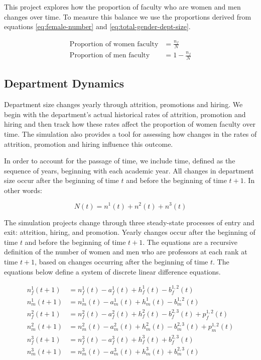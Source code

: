 \documentclass[12pt, a4paper, oneside, headinclude, footinclude,english]{article}
\begin{document}
This project explores how the proportion of  faculty who are women and men changes over time.  To measure this balance we use the proportions derived from equations \ref{eq:female-number} and \ref{eq:total-gender-dept-size}. 

\begin{align}
  \label{eq:pct-female}
  \text{Proportion of women faculty} &= \frac{n_f}{N} \label{eq:pct-female} \\
  \text{Proportion of men faculty} &= 1 - \frac{n_f}{N}          
\end{align}

\subsection{Department Dynamics}
\label{sec:dept-dynamics}

Department size changes yearly through attrition, promotions and hiring. We begin with the department's actual historical rates of attrition, promotion and hiring and then track how these rates affect the proportion of women faculty over time. The simulation also provides a tool for assessing how changes in the rates of attrition, promotion and hiring influence this outcome.

In order to account for the passage of time, we include time, defined as the sequence of years, beginning with each academic year.  All changes in department size occur after the beginning of time $t$ and before the beginning of time $t+1$. In other words:

\begin{equation*}
  N(t) = n^1(t) + n^2(t) + n^3(t) \label{eq:test}
\end{equation*}

The simulation projects change through three steady-state processes of entry and exit:
attrition, hiring, and promotion. Yearly changes occur after the beginning of time $t$ and before the beginning of time $t+1$.  The equations are a recursive definition of
the number of women and men who are professors at each rank at time $t+1$, based on
changes occurring after the beginning of time $t$. The equations below define a system of discrete
linear difference equations. 

\begin{align} 
  n^1_f(t+1) &= n^1_f(t) - a^1_f(t) + h^1_f(t) - b^{1,2}_f(t)  \label{eq:nf1} \\
  n^1_m(t+1) &= n^1_m(t) - a^1_m(t) + h^1_m(t) - b^{1,2}_m(t) \label{eq:nm1} \\
  n^2_f(t+1) &= n^2_f(t) - a^2_f(t) + h^2_f(t) - b^{2,3}_f(t) + p^{1,2}_f(t) \label{eq:nf2} \\ 
  n^2_m(t+1) &= n^2_m(t) - a^2_m(t) + h^2_m(t) - b^{2,3}_m(t) + p^{1,2}_m(t)  \label{eq:nm2} \\ 
  n^3_f(t+1) &= n^3_f(t) - a^3_f(t) + h^3_f(t) + b^{2,3}_f(t) \label{eq:nf3} \\
  n^3_m(t+1) &= n^3_m(t) - a^3_m(t) + h^3_m(t) + b^{2,3}_m(t) \label{eq:nm3}
\end{align}
\end{document}

